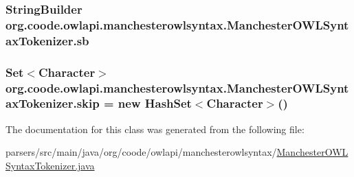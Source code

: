 \hypertarget{classorg_1_1coode_1_1owlapi_1_1manchesterowlsyntax_1_1_manchester_o_w_l_syntax_tokenizer_a158215089bcc0dc4f05ff959993f0852}{
\subsubsection[{sb}]{\setlength{\rightskip}{0pt plus 5cm}String\-Builder org.\-coode.\-owlapi.\-manchesterowlsyntax.\-Manchester\-O\-W\-L\-Syntax\-Tokenizer.\-sb\hspace{0.3cm}{\ttfamily [private]}}}\label{classorg_1_1coode_1_1owlapi_1_1manchesterowlsyntax_1_1_manchester_o_w_l_syntax_tokenizer_a158215089bcc0dc4f05ff959993f0852}
\hypertarget{classorg_1_1coode_1_1owlapi_1_1manchesterowlsyntax_1_1_manchester_o_w_l_syntax_tokenizer_aff48f95c9802938b89e1ee204f6749bb}{
\subsubsection[{skip}]{\setlength{\rightskip}{0pt plus 5cm}Set$<$Character$>$ org.\-coode.\-owlapi.\-manchesterowlsyntax.\-Manchester\-O\-W\-L\-Syntax\-Tokenizer.\-skip = new Hash\-Set$<$Character$>$()\hspace{0.3cm}{\ttfamily [protected]}}}\label{classorg_1_1coode_1_1owlapi_1_1manchesterowlsyntax_1_1_manchester_o_w_l_syntax_tokenizer_aff48f95c9802938b89e1ee204f6749bb}


The documentation for this class was generated from the following file\-:\begin{DoxyCompactItemize}
\item 
parsers/src/main/java/org/coode/owlapi/manchesterowlsyntax/\hyperlink{_manchester_o_w_l_syntax_tokenizer_8java}{Manchester\-O\-W\-L\-Syntax\-Tokenizer.\-java}\end{DoxyCompactItemize}
